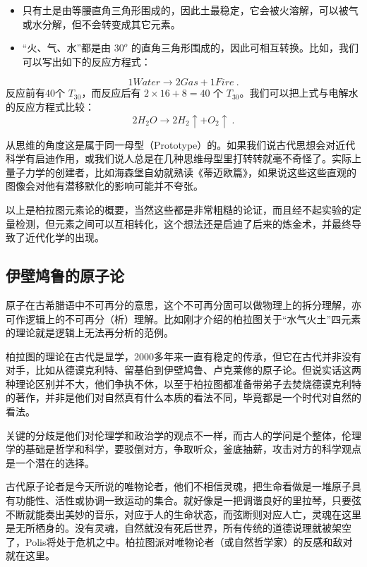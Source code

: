 \begin{itemize}
\item 只有土是由等腰直角三角形围成的，因此土最稳定，它会被火溶解，可以被气或水分解，但不会转变成其它元素。

\item “火、气、水”都是由 $30^o$ 的直角三角形围成的，因此可相互转换。比如，我们可以写出如下的反应方程式：
\end{itemize}

\begin{equation}
1 Water \to 2 Gas + 1 Fire ~.
\end{equation}
反应前有40个 $T_{30}$，而反应后有 $2 \times 16 + 8 = 40$ 个 $T_{30}$。我们可以把上式与电解水的反应方程式比较：
\begin{equation}
2 H_2 O \to 2 H_2 \uparrow + O_2 \uparrow~.
\end{equation}


从思维的角度这是属于同一母型（Prototype）的。如果我们说古代思想会对近代科学有启迪作用，或我们说人总是在几种思维母型里打转转就毫不奇怪了。实际上量子力学的创建者，比如海森堡自幼就熟读《蒂迈欧篇》，如果说这些这些直观的图像会对他有潜移默化的影响可能并不夸张。

以上是柏拉图元素论的概要，当然这些都是非常粗糙的论证，而且经不起实验的定量检测，但元素之间可以互相转化，这个想法还是启迪了后来的炼金术，并最终导致了近代化学的出现。

\subsection{伊壁鸠鲁的原子论}

原子在古希腊语中不可再分的意思，这个不可再分固可以做物理上的拆分理解，亦可作逻辑上的不可再分（析）理解。比如刚才介绍的柏拉图关于“水气火土”四元素的理论就是逻辑上无法再分析的范例。

柏拉图的理论在古代是显学，2000多年来一直有稳定的传承，但它在古代并非没有对手，比如从德谟克利特、留基伯到伊壁鸠鲁、卢克莱修的原子论。但说实话这两种理论区别并不大，他们争执不休，以至于柏拉图都准备带弟子去焚烧德谟克利特的著作，并非是他们对自然真有什么本质的看法不同，毕竟都是一个时代对自然的看法。

关键的分歧是他们对伦理学和政治学的观点不一样，而古人的学问是个整体，伦理学的基础是哲学和科学，要驳倒对方，争取听众，釜底抽薪，攻击对方的科学观点是一个潜在的选择。

古代原子论者是今天所说的唯物论者，他们不相信灵魂，把生命看做是一堆原子具有功能性、活性或协调一致运动的集合。就好像是一把调谐良好的里拉琴，只要弦不断就能奏出美妙的音乐，对应于人的生命状态，而弦断则对应人亡，灵魂在这里是无所栖身的。没有灵魂，自然就没有死后世界，所有传统的道德说理就被架空了，Polis将处于危机之中。柏拉图派对唯物论者（或自然哲学家）的反感和敌对就在这里。

